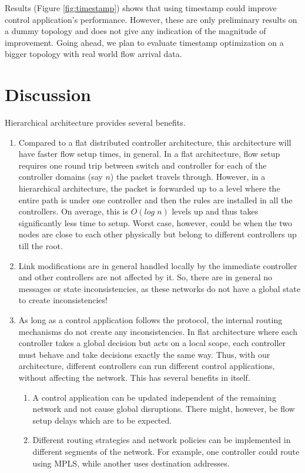 \documentclass[10pt, twocolumn]{article}
\begin{document}
Results (Figure \ref{fig:timestamp}) shows that using timestamp could improve control application's performance. However, these are only preliminary results on a dummy topology and does not give any indication of the magnitude of improvement. Going ahead, we plan to evaluate timestamp optimization on a bigger topology with real world flow arrival data. 

\section{Discussion}
\label{sec:discuss}
Hierarchical architecture provides several benefits.
\begin{enumerate}
    \item Compared to a flat distributed controller architecture, this architecture will have faster flow setup times, in general. In a flat architecture, flow setup requires one round trip between switch and controller for each of the controller domains (say $n$) the packet travels through. However, in a hierarchical architecture, the packet is forwarded up to a level where the entire path is under one controller and then the rules are installed in all the controllers. On average, this is $O(log\;n)$ levels up and thus takes significantly less time to setup. Worst case, however, could be when the two nodes are close to each other physically but belong to different controllers up till the root.
    \item Link modifications are in general handled locally by the immediate controller and other controllers are not affected by it. So, there are in general no messages or state inconsistencies, as these networks do not have a global state to create inconsistencies!
    \item As long as a control application follows the protocol, the internal routing mechanisms do not create any inconsistencies. In flat architecture where each controller takes a global decision but acts on a local scope, each controller must behave and take decisions exactly the same way. Thus, with our architecture, different controllers can run different control applications, without affecting the network. This has several benefits in itself.
        \begin{enumerate}
            \item A control application can be updated independent of the remaining network and not cause global disruptions. There might, however, be flow setup delays which are to be expected.
            \item Different routing strategies and network policies can be implemented in different segments of the network. For example, one controller could route using MPLS, while another uses destination addresses.

\end{enumerate}
\end{enumerate}
\end{document}

